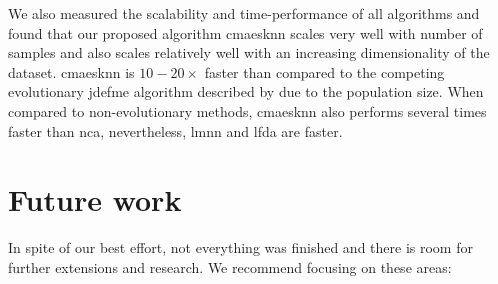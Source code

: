 \documentclass[12pt,a4paper]{report}
\begin{document}
We also measured the scalability and time-performance of all algorithms and found that our proposed algorithm \ac{cmaesknn} scales very well with number of samples and also scales relatively well with an increasing dimensionality of the dataset. \ac{cmaesknn} is $10-20\times$ faster than compared to the competing evolutionary \ac{jdefme} algorithm described by \citep{fukui2013evolutionary} due to the population size. When compared to non-evolutionary methods, \ac{cmaesknn} also performs several times faster than \ac{nca}, nevertheless, \ac{lmnn} and \ac{lfda} are faster.


\chapter{Future work} \label{chap:future-work}


In spite of our best effort, not everything was finished and there is room for further extensions and research. We recommend focusing on these areas:
\end{document}
